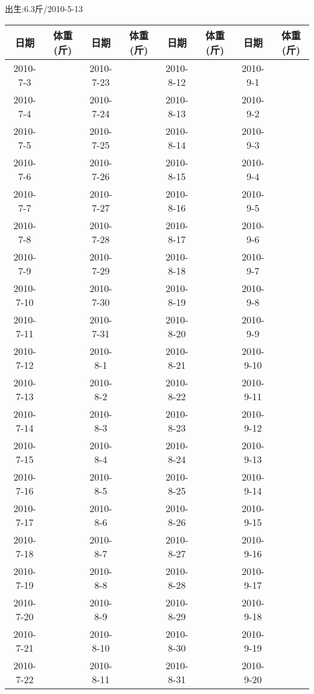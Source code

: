 ﻿\documentclass[11pt,a4paper,onecolumn]{article}
\begin{document}
\begin{center}
{\Large {}}
\end{center}

\makebox[1.6cm][s]{ }出生:6.3斤/2010-5-13

\begin{center}
\begin{tabular}{cc|cc|cc|cc}
\toprule
日期 & 体重(斤) & 日期 & 体重(斤) & 日期 & 体重(斤) & 日期 & 体重(斤)\\
\midrule
2010-7-3 & & 2010-7-23 & & 2010-8-12 & & 2010-9-1 & \\
2010-7-4 & & 2010-7-24 & & 2010-8-13 & & 2010-9-2 & \\
2010-7-5 & & 2010-7-25 & & 2010-8-14 & & 2010-9-3 & \\
2010-7-6 & & 2010-7-26 & & 2010-8-15 & & 2010-9-4 & \\
2010-7-7 & & 2010-7-27 & & 2010-8-16 & & 2010-9-5 & \\
2010-7-8 & & 2010-7-28 & & 2010-8-17 & & 2010-9-6 & \\
2010-7-9 & & 2010-7-29 & & 2010-8-18 & & 2010-9-7 & \\
2010-7-10 & & 2010-7-30 & & 2010-8-19 & & 2010-9-8 & \\
2010-7-11 & & 2010-7-31 & & 2010-8-20 & & 2010-9-9 & \\
2010-7-12 & & 2010-8-1 & & 2010-8-21 & & 2010-9-10 & \\
2010-7-13 & & 2010-8-2 & & 2010-8-22 & & 2010-9-11 & \\
2010-7-14 & & 2010-8-3 & & 2010-8-23 & & 2010-9-12 & \\
2010-7-15 & & 2010-8-4 & & 2010-8-24 & & 2010-9-13 & \\
2010-7-16 & & 2010-8-5 & & 2010-8-25 & & 2010-9-14 & \\
2010-7-17 & & 2010-8-6 & & 2010-8-26 & & 2010-9-15 & \\
2010-7-18 & & 2010-8-7 & & 2010-8-27 & & 2010-9-16 & \\
2010-7-19 & & 2010-8-8 & & 2010-8-28 & & 2010-9-17 & \\
2010-7-20 & & 2010-8-9 & & 2010-8-29 & & 2010-9-18 & \\
2010-7-21 & & 2010-8-10 & & 2010-8-30 & & 2010-9-19 & \\
2010-7-22 & & 2010-8-11 & & 2010-8-31 & & 2010-9-20 & \\
\bottomrule
\end{tabular}
\end{center}
\end{document}
